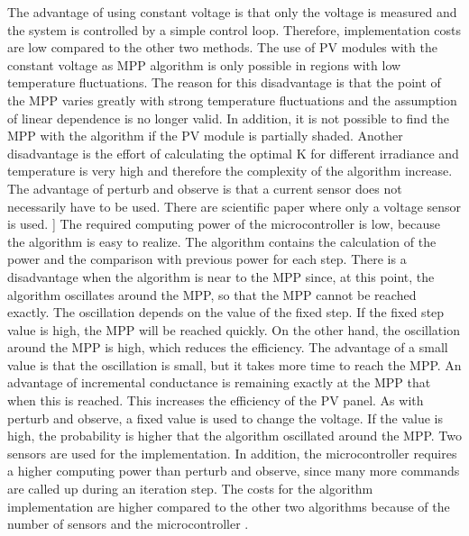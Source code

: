 \label{MPPTselection}

The advantage of using constant voltage is that only the voltage is measured and the system is controlled by a simple control loop. Therefore, implementation costs are low compared to the other two methods. The use of PV modules with the constant voltage as MPP algorithm is only possible in regions with low temperature fluctuations. The reason for this disadvantage is that the point of the MPP varies greatly with strong temperature fluctuations and the assumption of linear dependence is no longer valid. In addition, it is not possible to find the MPP with the algorithm if the PV module is partially shaded. Another disadvantage is the effort of calculating the optimal K for different irradiance and temperature is very high and therefore the complexity of the algorithm increase. \newline 
The advantage of perturb and observe is that a current sensor does not necessarily have to be used. There are scientific paper where only a voltage sensor is used. ] \cite{}  The required computing power of the microcontroller is low, because the algorithm is easy to realize. The algorithm contains the calculation of the power and the comparison with previous power for each step. There is a disadvantage when the algorithm is near to the MPP since, at this point, the algorithm oscillates around the MPP, so that the MPP cannot be reached exactly. The oscillation depends on the value of the fixed step. If the fixed step value is high, the MPP will be reached quickly. On the other hand, the oscillation around the MPP is high, which reduces the efficiency. The advantage of a small value is that the oscillation is small, but it takes more time to reach the MPP. \newline
An advantage of incremental conductance is remaining exactly at the MPP that when this is reached. This increases the efficiency of the PV panel. As with perturb and observe, a fixed value is used to change the voltage. If the value is high, the probability is higher that the algorithm oscillated around the MPP. 
Two sensors are used for the implementation. In addition, the microcontroller requires a higher computing power than perturb and observe, since many more commands are called up during an iteration step. The costs for the algorithm implementation are higher compared to the other two algorithms because of the number of sensors and the microcontroller . \newline
